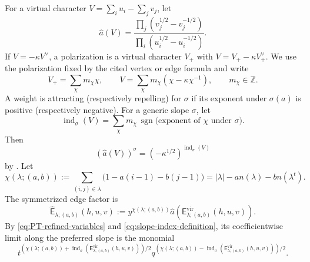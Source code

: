 \documentclass{amsart}
\theoremstyle{definition}
\numberwithin{equation}{section}
\newcommand{\Z}{\mathbb Z}
\begin{document}
For a virtual character \(V=\sum_i u_i-\sum_jv_j\), let
\begin{equation}
 \widehat a(V)
 =\frac{\prod_j(v_j^{1/2}-v_j^{-1/2})}
 {\prod_i(u_i^{1/2}-u_i^{-1/2})}.
\label{eq:symmetrized-Euler-character}
\end{equation}
If \(V=-\kappa V^\vee\), a polarization is a virtual character \(V_+\) with \(V=V_+-\kappa V_+^\vee\).  We use the polarization fixed by the cited vertex or edge formula and write
\[
 V_+=\sum_\chi m_\chi\chi,\qquad
 V=\sum_\chi m_\chi(\chi-\kappa\chi^{-1}),
 \qquad m_\chi\in\Z.
\]
A weight is attracting (respectively repelling) for \(\sigma\) if its exponent under \(\sigma(a)\) is positive (respectively negative).  For a generic slope \(\sigma\), let
\begin{equation}
 \operatorname{ind}_\sigma(V)
 =\sum_\chi m_\chi\,
   \operatorname{sgn}\bigl(\text{exponent of }\chi\text{ under }\sigma\bigr).
\label{eq:slope-index-definition}
\end{equation}
Then
\[
 (\widehat a(V))^\sigma=(-\kappa^{1/2})^{\operatorname{ind}_\sigma(V)}
\]
by \cite[Definition~4.1 and equation~(4.18)]{Arbesfeld}.  Let
\begin{equation}
 \chi(\lambda;(a,b))
 :=\sum_{(i,j)\in\lambda}
   \bigl(1-a(i-1)-b(j-1)\bigr)
 =|\lambda|-a n(\lambda)-b n(\lambda^t).
\label{eq:edge-partition-Euler-characteristic}
\end{equation}
The symmetrized edge factor is
\begin{equation}
 \widehat{\mathsf E}_{\lambda;(a,b)}(h,u,v)
 :=y^{\chi(\lambda;(a,b))}
   \widehat a\!\left(
    \mathsf E^{\mathrm{vir}}_{\lambda;(a,b)}(h,u,v)\right).
\label{eq:complete-symmetrized-edge-term}
\end{equation}
By \eqref{eq:PT-refined-variables} and \eqref{eq:slope-index-definition}, its coefficientwise limit along the preferred slope is the monomial
\begin{equation}
 t^{\left(\chi(\lambda;(a,b))+
 \operatorname{ind}_\sigma(
 \mathsf E^{\mathrm{vir}}_{\lambda;(a,b)}(h,u,v))\right)/2}
 q^{\left(\chi(\lambda;(a,b))-
 \operatorname{ind}_\sigma(
 \mathsf E^{\mathrm{vir}}_{\lambda;(a,b)}(h,u,v))\right)/2}.
\label{eq:edge-preferred-limit-monomial}
\end{equation}
\end{document}
